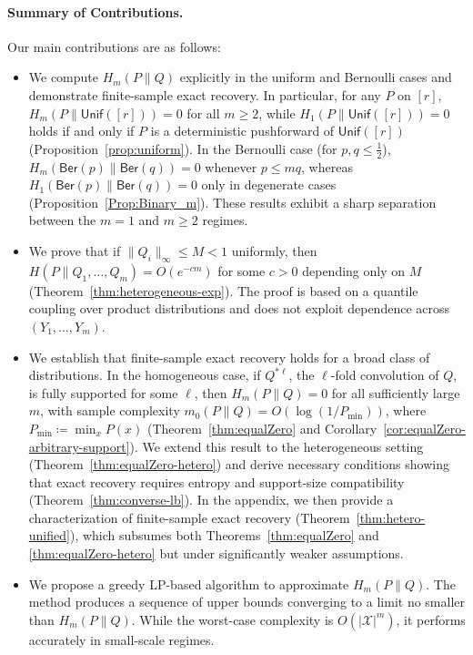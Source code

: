 \documentclass[journal]{IEEEtran}
\def\calX{{\mathcal X}}
\newcommand{\1}{\mathbf{1}}
\newcommand{\Ber}{\mathsf{Ber}}
\newcommand{\Unif}{\mathsf{Unif}}
\begin{document}
\paragraph{Summary of Contributions.}
Our main contributions are as follows:
\begin{itemize}
    \item We compute $H_m(P\|Q)$ explicitly in the uniform and Bernoulli cases and demonstrate finite-sample exact recovery. In particular, for any $P$ on $[r]$, $H_m(P\|\Unif([r]))=0$ for all $m\ge2$, while $H_1(P\|\Unif([r]))=0$ holds if and only if $P$ is a deterministic pushforward of $\Unif([r])$ (Proposition~\ref{prop:uniform}). In the Bernoulli case (for $p,q\le \tfrac12$), $H_m(\Ber(p)\|\Ber(q))=0$ whenever $p\le mq$, whereas $H_1(\Ber(p)\|\Ber(q))=0$ only in degenerate cases (Proposition~\ref{Prop:Binary_m}). These results exhibit a sharp separation between the $m=1$ and $m\ge2$ regimes.

    \item We prove that if $\|Q_i\|_\infty \le M < 1$ uniformly, then $H(P\|Q_1,\dots,Q_m)=O(e^{-cm})$ for some $c>0$ depending only on $M$ (Theorem~\ref{thm:heterogeneous-exp}). The proof is based on a quantile coupling over product distributions and does not exploit dependence across $(Y_1,\dots,Y_m)$.

    \item We establish that finite-sample exact recovery holds for a broad class of distributions. In the homogeneous case, if $Q^{*\ell}$, the $\ell$-fold convolution of $Q$, is fully supported for some $\ell$, then $H_m(P\|Q)=0$ for all sufficiently large $m$, with sample complexity $m_0(P\|Q)=O(\log(1/P_{\min}))$, where $P_{\min}\coloneqq \min_{x}P(x)$ (Theorem~\ref{thm:equalZero} and Corollary~\ref{cor:equalZero-arbitrary-support}). We extend this result to the heterogeneous setting (Theorem~\ref{thm:equalZero-hetero}) and derive necessary conditions showing that exact recovery requires entropy and support-size compatibility (Theorem~\ref{thm:converse-lb}).  In the appendix, we then provide a characterization of finite-sample exact recovery (Theorem~\ref{thm:hetero-unified}), which subsumes both Theorems~\ref{thm:equalZero} and \ref{thm:equalZero-hetero} but under significantly weaker assumptions.

    \item We propose a greedy LP-based algorithm to approximate $H_m(P\|Q)$. The method produces a sequence of upper bounds converging to a limit no smaller than $H_m(P\|Q)$. While the worst-case complexity is $O(|\calX|^m)$, it performs accurately in small-scale regimes.
\end{itemize}
\end{document}
